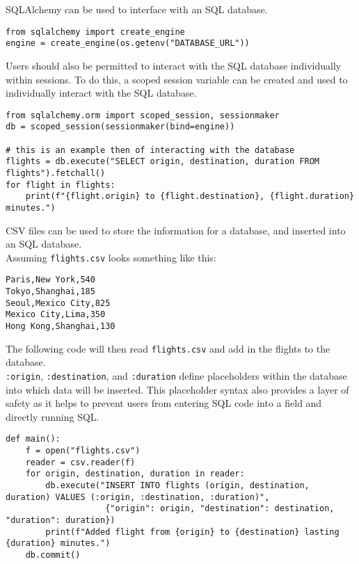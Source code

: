 \documentclass[]{book}
\begin{document}
SQLAlchemy can be used to interface with an SQL database.

\begin{verbatim}
from sqlalchemy import create_engine
engine = create_engine(os.getenv("DATABASE_URL"))
\end{verbatim}

Users should also be permitted to interact with the SQL database individually within sessions. To do this, a scoped session variable can be created and used to individually interact with the SQL database.

\begin{verbatim}
from sqlalchemy.orm import scoped_session, sessionmaker
db = scoped_session(sessionmaker(bind=engine))

# this is an example then of interacting with the database
flights = db.execute("SELECT origin, destination, duration FROM flights").fetchall()
for flight in flights:
    print(f"{flight.origin} to {flight.destination}, {flight.duration} minutes.")
\end{verbatim}

CSV files can be used to store the information for a database, and inserted into an SQL database.\\
Assuming \texttt{flights.csv} looks something like this:

\begin{verbatim}
Paris,New York,540    
Tokyo,Shanghai,185    
Seoul,Mexico City,825 
Mexico City,Lima,350  
Hong Kong,Shanghai,130
\end{verbatim}

The following code will then read \texttt{flights.csv} and add in the flights to the database.\\
\texttt{:origin}, \texttt{:destination}, and \texttt{:duration} define placeholders within the database into which data will be inserted. This placeholder syntax also provides a layer of safety as it helps to prevent users from entering SQL code into a field and directly running SQL.

\begin{verbatim}
def main():
    f = open("flights.csv")                                                                                        
    reader = csv.reader(f)                                                                                         
    for origin, destination, duration in reader:                                                                   
        db.execute("INSERT INTO flights (origin, destination, duration) VALUES (:origin, :destination, :duration)",
                    {"origin": origin, "destination": destination, "duration": duration})                          
        print(f"Added flight from {origin} to {destination} lasting {duration} minutes.")                          
    db.commit()                                                                                                    
\end{verbatim}
\end{document}
